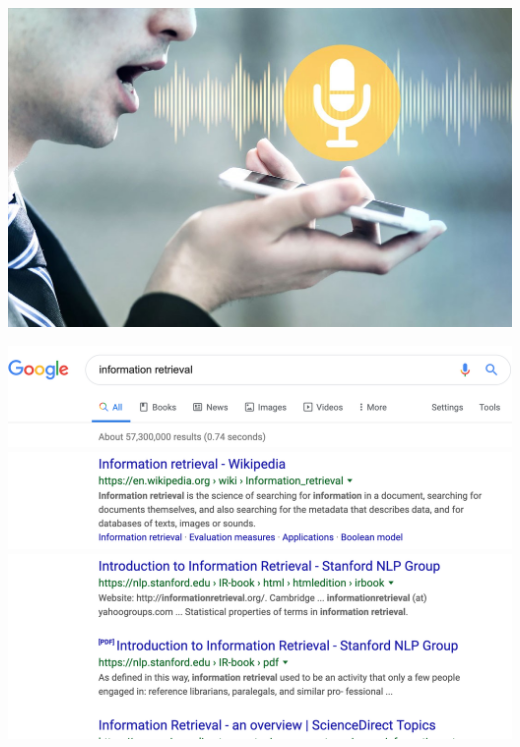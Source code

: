 \documentclass[landscape]{jhuslides3C}
\begin{document}
\vfill
\begin{center}
\includegraphics[width=23cm]{speech-recognition.jpg}
\end{center}
\vfill


\vfill
\begin{center}
\includegraphics[width=20cm]{information-retrieval1.png}\\
\includegraphics[width=20cm]{information-retrieval2.png}\\
\includegraphics[width=20cm]{information-retrieval3.png}
\end{center}
\vfill
\end{document}
